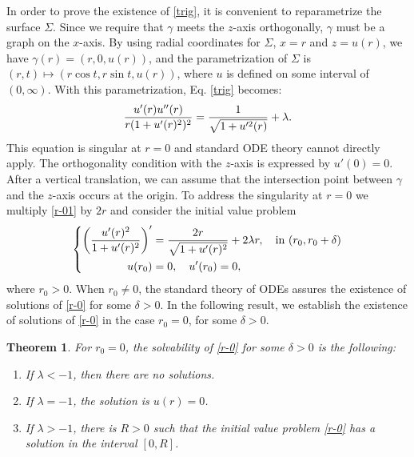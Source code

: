 \documentclass[12pt]{amsart}
\newtheorem{theorem}{Theorem}[section]
\theoremstyle{definition}
\begin{document}
In order to prove the existence of \eqref{trig}, it is convenient to reparametrize the surface $\Sigma$. Since we require that $\gamma$ meets the $z$-axis orthogonally, $\gamma$ must be a graph on the $x$-axis.  By using radial coordinates for $\Sigma$, $x=r$ and $z=u(r)$, we have   $\gamma(r)=(r,0,u(r))$, and the parametrization of $\Sigma$ is $(r,t)\mapsto (r\cos t,r\sin t,u(r))$, where $u$ is defined on some interval of $(0,\infty)$. With this parametrization, Eq.  \eqref{trig} becomes:
\begin{equation}\label{r-01}
\dfrac{u'(r)u''(r)}{r(1+u'(r)^2)^{2}}=\dfrac{1}{\sqrt{%
1+u'^2(r)}}+\lambda. 
\end{equation}
This equation is singular at $r=0$ and standard  ODE theory cannot directly apply. The orthogonality condition with the $z$-axis is expressed by $u'(0)=0$. After a vertical translation, we can assume that the intersection point between  $\gamma$  and the $z$-axis occurs at the origin. To address the singularity at $r=0$ we multiply \eqref{r-01} by $2r$ and consider the initial value problem
\begin{equation} \label{r-0}
\left\{ 
\begin{split}
\left (\dfrac{u'(r)^2}{1+u'(r)^2}\right )'&=\frac{2r}{\sqrt{%
1+u'(r)^2}}+2\lambda r, \quad \mbox{in } (r_0,r_0+\delta) \\ 
u(r_0)&=0, \quad u'(r_0)=0,%
\end{split}
\right. 
\end{equation}
where $r_0>0$.    When $r_0\not=0$, the standard theory of ODEs assures the existence of solutions of \eqref{r-0} for some $\delta>0$. In the following result, we establish the existence of solutions of \eqref{r-0} in the case $r_0=0$, for some $\delta>0$.

\begin{theorem} \label{t1}
For $r_0=0$, the solvability of \eqref{r-0} for some $\delta>0$ is the following:
\begin{enumerate}
\item If
$\lambda<-1$, then there are no solutions.
\item If $\lambda=-1$, the solution is $u(r)=0$.
\item If $\lambda>-1$, there is $R>0$ such that the initial value problem \eqref{r-0} has a solution in the interval $[0,R]$. 
\end{enumerate}
\end{theorem}
\end{document}
